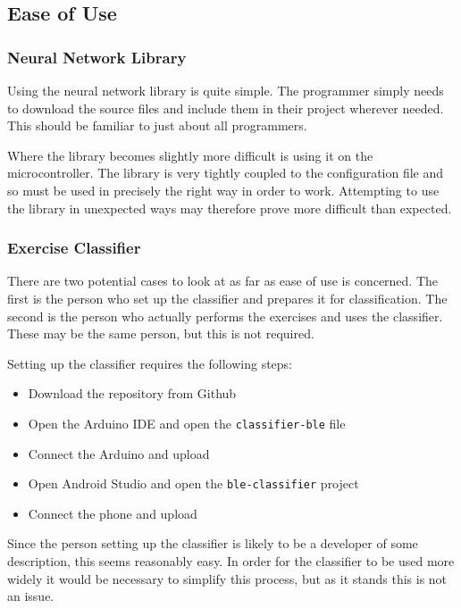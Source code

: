 \documentclass[a4paper]{article}
\begin{document}

\subsection{Ease of Use}%

\subsubsection{Neural Network Library}

Using the neural network library is quite simple. The programmer simply needs to download the source files and include them in their project wherever needed. This should be familiar to just about all programmers.

Where the library becomes slightly more difficult is using it on the microcontroller. The library is very tightly coupled to the configuration file and so must be used in precisely the right way in order to work. Attempting to use the library in unexpected ways may therefore prove more difficult than expected.

\subsubsection{Exercise Classifier}

There are two potential cases to look at as far as ease of use is concerned. The first is the person who set up the classifier and prepares it for classification. The second is the person who actually performs the exercises and uses the classifier. These may be the same person, but this is not required.

Setting up the classifier requires the following steps:

\begin{itemize}
\item Download the repository from Github
\item Open the Arduino IDE and open the \lstinline{classifier-ble} file
\item Connect the Arduino and upload
\item Open Android Studio and open the \lstinline{ble-classifier} project
\item Connect the phone and upload
\end{itemize}

Since the person setting up the classifier is likely to be a developer of some description, this seems reasonably easy. In order for the classifier to be used more widely it would be necessary to simplify this process, but as it stands this is not an issue.
\end{document}
